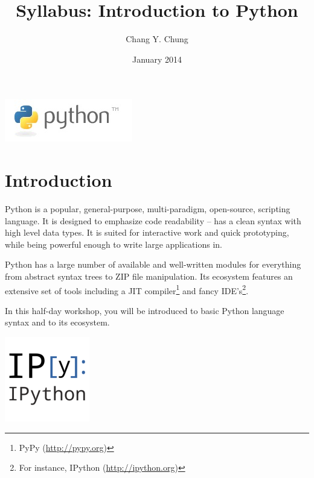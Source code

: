 \documentclass{tufte-handout}
\title{Syllabus: Introduction to Python}
\author{Chang Y. Chung}
\date{January 2014}
\begin{document}
\maketitle

\begin{marginfigure}%
  \includegraphics[width=\linewidth]{python}
  \caption{Python logo from \url{http://www.python.org}. The name is not
    after those dangerous reptiles; it is from the seventies comedy series
    ``Monte Python's Flying Circus''.}
  \label{fig:Python}
\end{marginfigure} 

\section{Introduction}\label{sec:introduction}
Python is a popular, general-purpose, multi-paradigm,
open-source, scripting language. It is designed to emphasize code
readability -- has a clean syntax with high level data types. It is
suited for interactive work and quick prototyping, while being powerful
enough to write large applications in.

Python has a large number of available and well-written modules for
everything from abstract syntax trees to ZIP file manipulation. Its
ecosystem features an extensive set of tools including a JIT
compiler\footnote{PyPy (\url{http://pypy.org})} and fancy
IDE's\footnote{For instance, IPython (\url{http://ipython.org})}.

In this half-day workshop, you will be introduced to basic Python
language syntax and to its ecosystem.

\begin{marginfigure}%
  \includegraphics[width=0.4\linewidth]{ipython}
  \caption{IPython (\url{http://ipython.org}) is a rich architecture for
    interactive computing. Version 1.0.0 was released on Aug, 2013.}
  \label{fig:IPython}
\end{marginfigure} 
\end{document}
